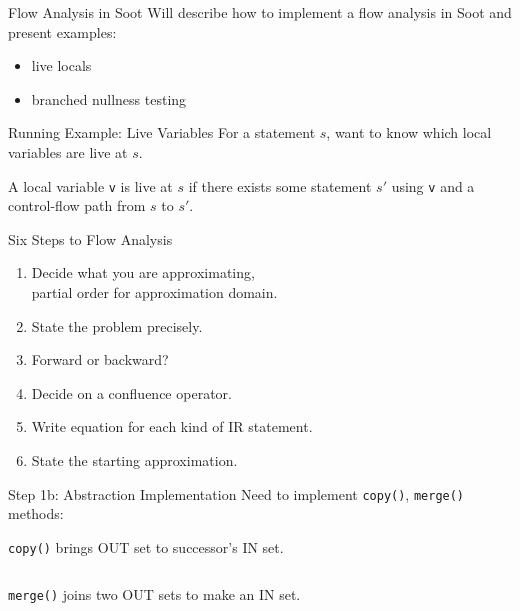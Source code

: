 \begin{slide}{Flow Analysis in Soot}
Will describe how to implement a flow analysis in Soot and present examples:
\begin{itemize}
\item live locals
\item branched nullness testing
\end{itemize}
\end{slide}

\begin{slide}{Running Example: Live Variables}
\vspace*{-0.2in}
For a statement $s$, want to know which local variables
are {\green live} at $s$.

A local variable {\tt v} is live at $s$ if there exists some statement
$s'$ using {\tt v} and a control-flow path from $s$ to $s'$.

\begin{center}
%
\end{center}
\end{slide}

\begin{slide}{Six Steps to Flow Analysis}
\begin{enumerate}
\item Decide what you are approximating,\\ partial order for approximation domain.

\item State the problem precisely.

\item Forward or backward?

\item Decide on a confluence operator.

\item Write equation for each kind of IR statement.

\item State the starting approximation.
\end{enumerate}
\end{slide}


\begin{slide}{Step 1b: Abstraction Implementation}
Need to implement {\tt copy()}, {\tt merge()} methods:
\begin{center}

\end{center}
{\tt copy()} brings OUT set to successor's IN set.

$\qquad$

\begin{center}

\end{center}
{\tt merge()} joins two OUT sets to make an IN set.
\end{slide}

